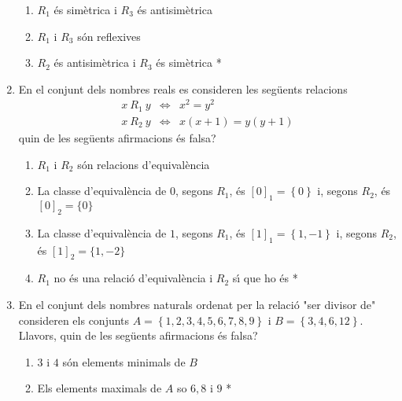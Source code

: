 \begin{enumerate}
\begin{enumerate}
\item $R_{1}$ \'{e}s sim\`{e}trica i $R_{3}$ \'{e}s antisim\`{e}trica

\item $R_{1}$ i $R_{3}$ s\'{o}n reflexives

\item $R_{2}$ \'{e}s antisim\`{e}trica i $R_{3}$ \'{e}s sim\`{e}trica *
\end{enumerate}

\item En el conjunt dels nombres reals es consideren les seg\"{u}ents
relacions%
\begin{equation*}
\begin{array}{lll}
x~R_{1}~y & \Longleftrightarrow & x^{2}=y^{2} \\
x~R_{2}~y & \Longleftrightarrow & x(x+1)=y(y+1)%
\end{array}%
\end{equation*}
quin de les seg\"{u}ents afirmacions \'{e}s falsa?

\begin{enumerate}
\item $R_{1}$ i $R_{2}$ s\'{o}n relacions d'equival\`{e}ncia

\item La classe d'equival\`{e}ncia de $0$, segons $R_{1}$, \'{e}s $\left[ 0%
\right] _{1}=\left\{ 0\right\} $ i, segons $R_{2}$, \'{e}s $\left[ 0\right]
_{2}=\{0\} $

\item La classe d'equival\`{e}ncia de $1$, segons $R_{1}$, \'{e}s $\left[ 1%
\right] _{1}=\left\{ 1,-1\right\} $ i, segons $R_{2}$, \'{e}s $\left[ 1%
\right] _{2}=\{1,-2\}$

\item $R_{1}$ no \'{e}s una relaci\'{o} d'equival\`{e}ncia i $R_{2}$ s\'{\i}
que ho \'{e}s *
\end{enumerate}

\item En el conjunt dels nombres naturals ordenat per la relaci\'{o} "ser
divisor de" consideren els conjunts $A=\left\{ 1,2,3,4,5,6,7,8,9\right\} $ i
$B=\left\{ 3,4,6,12\right\} $. Llavors, quin de les seg\"{u}ents afirmacions
\'{e}s falsa?

\begin{enumerate}
\item $3$ i $4$ s\'{o}n elements minimals de $B$

\item Els elements maximals de $A$ so $6,8$ i $9$ *


\end{enumerate}
\end{enumerate}
